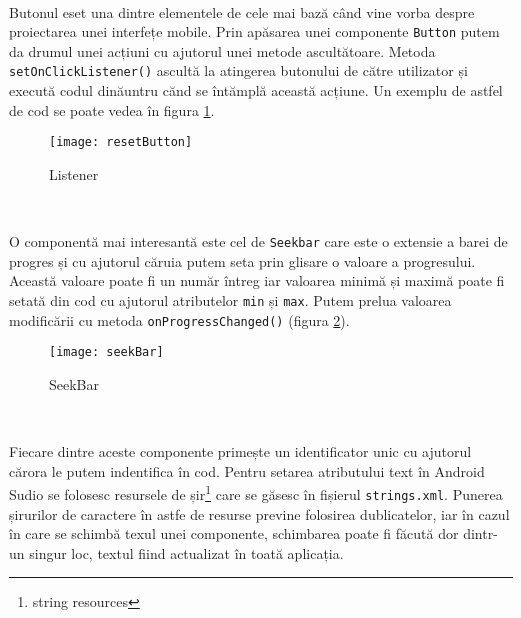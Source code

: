 \documentclass[../IoMusT.tex]{subfiles}
\begin{document}
\\
\par Butonul eset una dintre elementele de cele mai bază când vine vorba despre proiectarea unei interfețe mobile. Prin apăsarea unei componente \verb|Button| putem da drumul unei acțiuni cu ajutorul unei metode ascultătoare. Metoda \verb|setOnClickListener()| ascultă la atingerea butonului de către utilizator și execută codul dinăuntru cănd se întămplă această acțiune. Un exemplu de astfel de cod se poate vedea în figura \ref{fig:reset}.
\begin{figure}[h]
\centering
\texttt{[image: resetButton]}
\caption{Listener}
\label{fig:reset}
\end{figure}
\\
\par O componentă mai interesantă este cel de \verb|Seekbar| care este o extensie a barei de progres și cu ajutorul căruia putem seta prin glisare o valoare a progresului. Această valoare poate fi un număr întreg iar valoarea minimă și maximă poate fi setată din cod cu ajutorul atributelor \verb|min| și \verb|max|. Putem prelua valoarea modificării cu metoda \verb|onProgressChanged()| (figura \ref{fig:seek}).
\begin{figure}[h]
\centering
\texttt{[image: seekBar]}
\caption{SeekBar}
\label{fig:seek}
\end{figure}
\\
\par Fiecare dintre aceste componente primește un identificator unic cu ajutorul cărora le putem indentifica în cod. Pentru setarea atributului text în Android Sudio se folosesc resursele de șir\footnote{string resources} care se găsesc în fișierul \verb|strings.xml|. Punerea șirurilor de caractere în astfe de resurse previne folosirea dublicatelor, iar în cazul în care se schimbă texul unei componente, schimbarea poate fi făcută dor dintr-un singur loc, textul fiind actualizat în toată aplicația.
\end{document}
